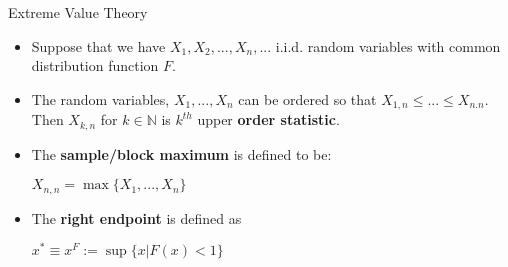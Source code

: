 \documentclass[notes]{beamer}
\begin{document}
\begin{frame}{Extreme Value Theory}
\begin{itemize}
\item Suppose that we have $X_1, X_2, ... , X_n, ... $ i.i.d. random variables with common distribution function $F$. 
\item The random variables, $X_1, ... , X_n$ can be ordered so that $X_{1,n} \le ... \le X_{n.n}$. Then $X_{k,n} $ for $k \in \mathbb{N}$ is $k^{th}$ upper \textbf{order statistic}.

\item The \textbf{sample/block maximum} is defined to be:

\begin{center} $ X_{n,n} = \max\{X_1, ... , X_n\}$ \end{center}

\item The \textbf{right endpoint} is defined as

\begin{center} $x^* \equiv x^F:= \sup\{x | F(x) < 1\}$ \end{center}


\end{itemize}
\end{frame}
\end{document}
